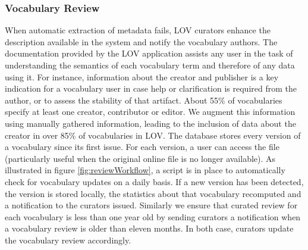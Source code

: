\documentclass{iosart2c}
\begin{document}
	\subsubsection{Vocabulary Review}
When automatic extraction of metadata fails, LOV curators enhance the description available in the system and notify the vocabulary authors. The documentation provided by the LOV application assists any user in the task of understanding the semantics of each vocabulary term and therefore of any data using it. For instance, information about the creator and publisher is a key indication for a vocabulary user in case help or clarification is required from the author, or to assess the stability of that artifact. About 55\% of vocabularies specify at least one creator, contributor or editor. We augment this information using manually gathered information, leading to the inclusion of data about the creator in over 85\% of vocabularies in LOV. The database stores every version of a vocabulary since its first issue. For each version, a user can access the file (particularly useful when the original online file is no longer available). As illustrated in figure \ref{fig:reviewWorkflow}, a script is in place to automatically check for vocabulary updates on a daily basis. If a new version has been detected, the version is stored locally, the statistics about that vocabulary recomputed and a notification to the curators issued. Similarly we ensure that curated review for each vocabulary is less than one year old by sending curators a notification when a vocabulary review is older than eleven months. In both case, curators update the vocabulary review accordingly. 
\end{document}
